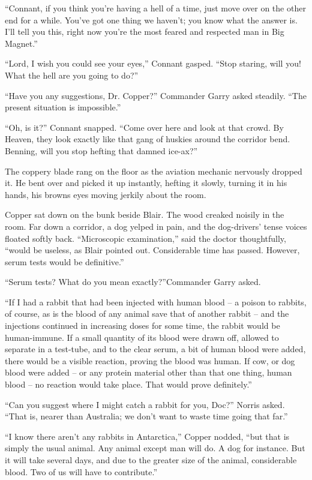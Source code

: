\documentclass[letterpaper,openany,12pt]{memoir}		%
\begin{document}
``Connant, if you think you're having a hell of a time, just move over on the
other end for a while. You've got one thing we haven't; you know what the answer
is. I'll tell you this, right now you're the most feared and respected man in
Big Magnet.''

``Lord, I wish you could see your eyes,'' Connant gasped. ``Stop staring, will
you! What the hell are you going to do?''

``Have you any suggestions, Dr. Copper?'' Commander Garry asked steadily. ``The
present situation is impossible.''

``Oh, is it?'' Connant snapped. ``Come over here and look at that crowd. By
Heaven, they look exactly like that gang of huskies around the corridor bend.
Benning, will you stop hefting that damned ice-ax?''

The coppery blade rang on the floor as the aviation mechanic nervously dropped
it. He bent over and picked it up instantly, hefting it slowly, turning it in
his hands, his browns eyes moving jerkily about the room.

Copper sat down on the bunk beside Blair. The wood creaked noisily in the room.
Far down a corridor, a dog yelped in pain, and the dog-drivers' tense voices
floated softly back. ``Microscopic examination,'' said the doctor thoughtfully,
``would be useless, as Blair pointed out. Considerable time has passed. However,
serum tests would be definitive.''

``Serum tests? What do you mean exactly?''Commander Garry asked.

``If I had a rabbit that had been injected with human blood -- a poison to
rabbits, of course, as is the blood of any animal save that of another rabbit --
and the injections continued in increasing doses for some time, the rabbit would
be human-immune. If a small quantity of its blood were drawn off, allowed to
separate in a test-tube, and to the clear serum, a bit of human blood were
added, there would be a visible reaction, proving the blood was human. If cow,
or dog blood were added -- or any protein material other than that one thing,
human blood -- no reaction would take place. That would prove definitely.''

``Can you suggest where I might catch a rabbit for you, Doc?'' Norris asked.
``That is, nearer than Australia; we don't want to waste time going that far.''

``I know there aren't any rabbits in Antarctica,'' Copper nodded, ``but that is
simply the usual animal. Any animal except man will do. A dog for instance. But
it will take several days, and due to the greater size of the animal,
considerable blood. Two of us will have to contribute.''
\end{document}
